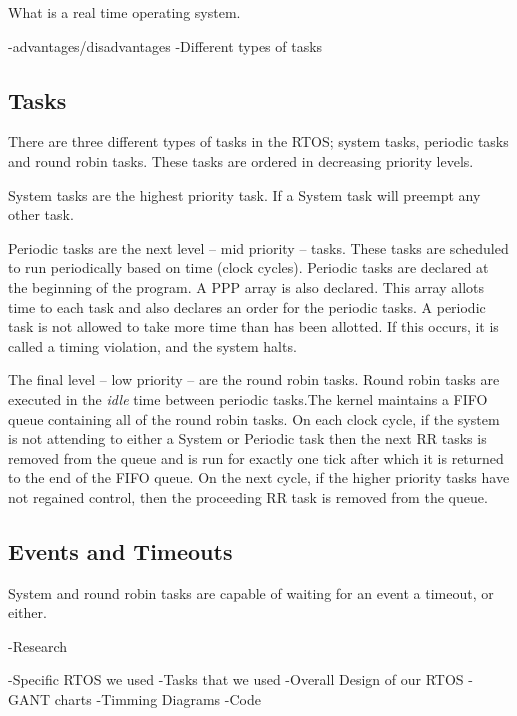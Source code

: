 What is a real time operating system.

-advantages/disadvantages
-Different types of tasks
\subsection{Tasks}

There are three different types of tasks in the RTOS; system tasks, periodic tasks and round robin tasks. These tasks are ordered in decreasing priority levels. \\


System tasks are the highest priority task. If a System task will preempt any other task.\\


Periodic tasks are the next level -- mid priority -- tasks. These tasks are scheduled to run periodically based on time (clock cycles). 
Periodic tasks are declared at the beginning of the program. A PPP array is also declared. This array allots time to each task and also declares an order for the periodic tasks. A periodic task is not allowed to take more time than has been allotted. If this occurs, it is called a timing violation, and the system halts.  \\


The final level -- low priority -- are the round robin tasks. Round robin tasks are executed in the \textit{idle} time between periodic tasks.The kernel maintains a FIFO queue containing all of the round robin tasks. On each clock cycle, if the system is not attending to either a System or Periodic task then the next RR tasks is removed from the queue and is run for exactly one tick after which it is returned to the end of the FIFO queue. On the next cycle, if the higher priority tasks have not regained control, then the proceeding RR task is removed from the queue.  



\subsection{Events and Timeouts}

System and round robin tasks are capable of waiting for an event a timeout, or
either. 



-Research

-Specific RTOS we used
-Tasks that we used
-Overall Design of our RTOS
-GANT charts
-Timming Diagrams
-Code

